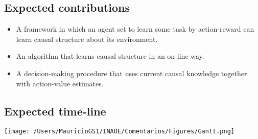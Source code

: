 \documentclass[a0,portrait]{a0poster}
\begin{document}
\begin{multicols}{3}
\subsection*{Expected contributions}
\begin{itemize}
\item A framework in which an agent set to learn some task by action-reward can learn causal structure about its environment.
\item An algorithm that learns causal structure in an on-line way.
\item A decision-making procedure that uses current causal knowledge together with action-value estimates.
\end{itemize}
\subsection*{Expected time-line}
\begin{center}
\texttt{[image: /Users/MauricioGS1/INAOE/Comentarios/Figures/Gantt.png]}
\end{center}


\end{multicols}
%
%
\end{document}

